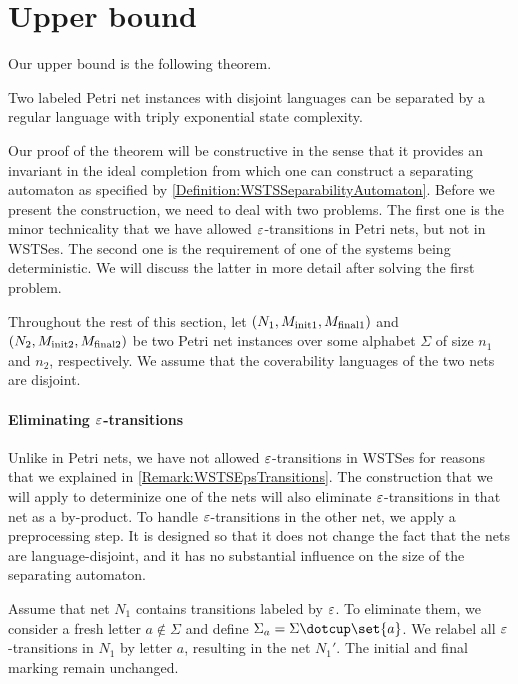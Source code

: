 \documentclass[../../diss.tex]{subfiles}
\begin{document}
\section{Upper bound}%
\label{Section:PNSeparabilityUpperBound}%

Our upper bound is the following theorem.

\begin{theorem}%
\label{Theorem:PNSeparabilityUpperBound}%
    Two labeled Petri net instances with disjoint languages can be separated by a regular language with triply exponential state complexity.
\end{theorem}

Our proof of the theorem will be constructive in the sense that it provides an invariant in the ideal completion from which one can construct a separating automaton as specified by \cref{Definition:WSTSSeparabilityAutomaton}.
Before we present the construction, we need to deal with two problems.
The first one is the minor technicality that we have allowed $\varepsilon$-transitions in Petri nets, but not in WSTSes.
The second one is the requirement of one of the systems being deterministic.
We will discuss the latter in more detail after solving the first problem.

Throughout the rest of this section, let $(N_1,M_{{\text{init}}1},M_{{\text{final}}1})$ and $(N_2,M_{{\text{init}}2},M_{{\text{final}}2})$ be two Petri net instances over some alphabet $\Sigma$ of size $n_1$ and $n_2$, respectively.
We assume that the coverability languages of the two nets are disjoint.

\paragraph{Eliminating $\varepsilon$-transitions}

Unlike in Petri nets, we have not allowed $\varepsilon$-transitions in WSTSes for reasons that we explained in \cref{Remark:WSTSEpsTransitions}.
The construction that we will apply to determinize one of the nets will also eliminate $\varepsilon$-transitions in that net as a by-product.
To handle $\varepsilon$-transitions in the other net, we apply a preprocessing step.
It is designed so that it does not change the fact that the nets are language-disjoint, and it has no substantial influence on the size of the separating automaton.

Assume that net $N_1$ contains transitions labeled by $\varepsilon$.
To eliminate them, we consider a fresh letter $a \not\in \Sigma$ and define $\Sigma_a = \Sigma \dotcup \set{a}$.
We relabel all $\varepsilon$-transitions in $N_1$ by letter $a$, resulting in the net $N_1'$.
The initial and final marking remain unchanged.
\end{document}
